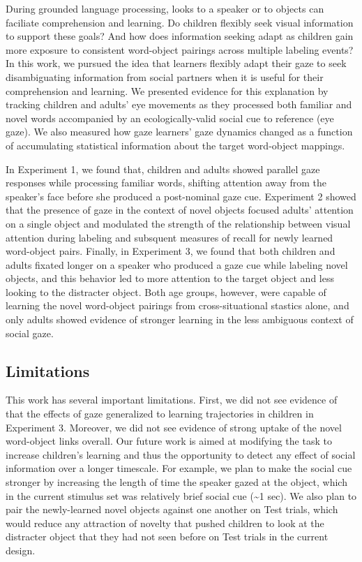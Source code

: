 \documentclass[man,floatsintext]{apa6}
\begin{document}
During grounded language processing, looks to a speaker or to objects
can faciliate comprehension and learning. Do children flexibly seek
visual information to support these goals? And how does information
seeking adapt as children gain more exposure to consistent word-object
pairings across multiple labeling events? In this work, we pursued the
idea that learners flexibly adapt their gaze to seek disambiguating
information from social partners when it is useful for their
comprehension and learning. We presented evidence for this explanation
by tracking children and adults' eye movements as they processed both
familiar and novel words accompanied by an ecologically-valid social cue
to reference (eye gaze). We also measured how gaze learners' gaze
dynamics changed as a function of accumulating statistical information
about the target word-object mappings.

In Experiment 1, we found that, children and adults showed parallel gaze
responses while processing familiar words, shifting attention away from
the speaker's face before she produced a post-nominal gaze cue.
Experiment 2 showed that the presence of gaze in the context of novel
objects focused adults' attention on a single object and modulated the
strength of the relationship between visual attention during labeling
and subsquent measures of recall for newly learned word-object pairs.
Finally, in Experiment 3, we found that both children and adults fixated
longer on a speaker who produced a gaze cue while labeling novel
objects, and this behavior led to more attention to the target object
and less looking to the distracter object. Both age groups, however,
were capable of learning the novel word-object pairings from
cross-situational stastics alone, and only adults showed evidence of
stronger learning in the less ambiguous context of social gaze.

\subsection{Limitations}\label{limitations-1}

This work has several important limitations. First, we did not see
evidence of that the effects of gaze generalized to learning
trajectories in children in Experiment 3. Moreover, we did not see
evidence of strong uptake of the novel word-object links overall. Our
future work is aimed at modifying the task to increase children's
learning and thus the opportunity to detect any effect of social
information over a longer timescale. For example, we plan to make the
social cue stronger by increasing the length of time the speaker gazed
at the object, which in the current stimulus set was relatively brief
social cue (\textasciitilde{}1 sec). We also plan to pair the
newly-learned novel objects against one another on Test trials, which
would reduce any attraction of novelty that pushed children to look at
the distracter object that they had not seen before on Test trials in
the current design.
\end{document}
